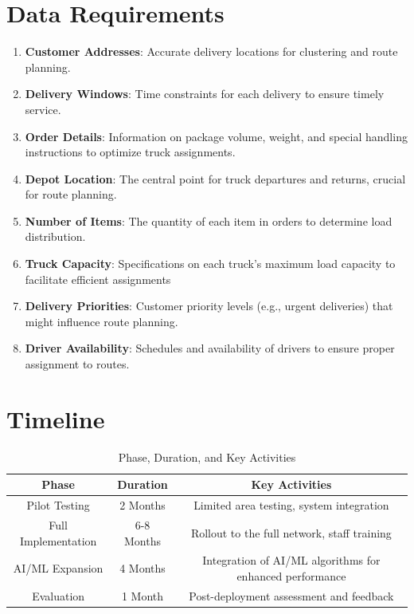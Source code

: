 \documentclass[a4paper,12pt, final]{article}
\begin{document}
\section{Data Requirements}
\begin{enumerate}
    \item \textbf{Customer Addresses}: Accurate delivery locations for clustering and route planning.
    \item \textbf{Delivery Windows}: Time constraints for each delivery to ensure timely service.
    \item \textbf{Order Details}: Information on package volume, weight, and special handling instructions to optimize truck assignments.
    \item \textbf{Depot Location}: The central point for truck departures and returns, crucial for route planning.
    \item \textbf{Number of Items}: The quantity of each item in orders to determine load distribution.
    \item \textbf{Truck Capacity}: Specifications on each truck's maximum load capacity to facilitate efficient assignments
    \item \textbf{Delivery Priorities}: Customer priority levels (e.g., urgent deliveries) that might influence route planning.
    \item \textbf{Driver Availability}: Schedules and availability of drivers to ensure proper assignment to routes.
\end{enumerate}


\section{Timeline}

\begin{table}[ht]
    \centering
    \begin{tabular}{|c|c|c|}
        \hline
        \textbf{Phase} & \textbf{Duration} & \textbf{Key Activities} \\ \hline
        Pilot Testing     & 2 Months   & Limited area testing, system integration \\ \hline
        Full Implementation & 6-8 Months & Rollout to the full network, staff training \\ \hline
        AI/ML Expansion   & 4 Months   & Integration of AI/ML algorithms for enhanced performance \\ \hline
        Evaluation        & 1 Month    & Post-deployment assessment and feedback \\ \hline
    \end{tabular}
    \caption{Phase, Duration, and Key Activities}
\end{table}
\end{document}
